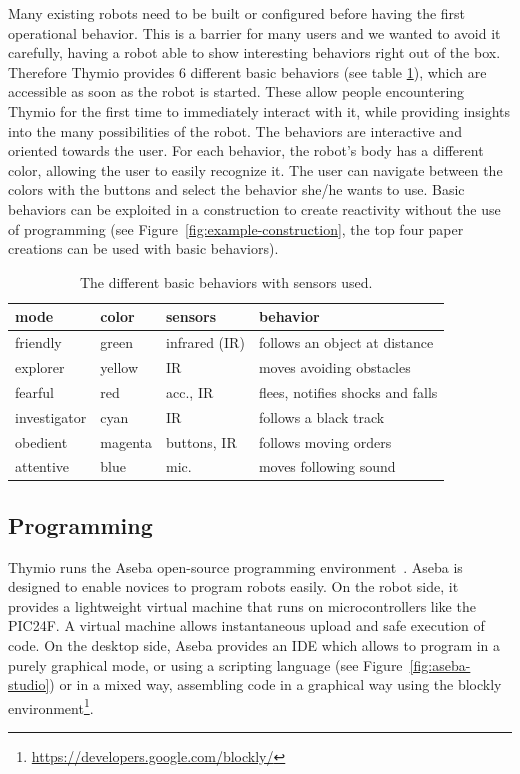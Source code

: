 \documentclass[letterpaper, 10 pt, conference]{ieeeconf}  %
\begin{document}
Many existing robots need to be built or configured before having the first operational behavior. 
This is a barrier for many users and we wanted to avoid it carefully, having a robot able to show interesting behaviors right out of the box.
Therefore Thymio provides 6 different basic behaviors (see table \ref{tbl:basic-behaviors}), which are accessible as soon as the robot is started.
These allow people encountering Thymio for the first time to immediately interact with it, while providing insights into the many possibilities of the robot.
The behaviors are interactive and oriented towards the user. %
For each behavior, the robot's body has a different color, allowing the user to easily recognize it.
The user can navigate between the colors with the buttons and select the behavior she/he wants to use.
Basic behaviors can be exploited in a construction to create reactivity without the use of programming (see Figure~\ref{fig:example-construction}, the top four paper creations can be used with basic behaviors).

\begin{table}
\begin{tabularx}{\columnwidth}{@{}llll@{}}
\toprule
mode & color & sensors & behavior \\
\midrule
friendly & green & infrared (IR) & follows an object at distance \\
explorer & yellow & IR & moves avoiding obstacles \\
fearful & red & acc., IR & flees, notifies shocks and falls \\
investigator & cyan & IR & follows a black track \\
obedient & magenta & buttons, IR & follows moving orders \\
attentive & blue & mic. & moves following sound \\
\bottomrule
\end{tabularx}
\caption{The different basic behaviors with sensors used.}
\label{tbl:basic-behaviors}
\end{table}


\subsection{Programming}
\label{sec:aseba}

Thymio runs the Aseba open-source programming environment~\cite{aseba}.
Aseba is designed to enable novices to program robots easily.
On the robot side, it provides a lightweight virtual machine that runs on microcontrollers like the PIC24F.
A virtual machine allows instantaneous upload and safe execution of code.
On the desktop side, Aseba provides an IDE which allows to program in a purely graphical mode, or using a scripting language (see Figure~\ref{fig:aseba-studio}) or in a mixed way, assembling code in a graphical way using the blockly environment\footnote{\url{https://developers.google.com/blockly/}}.
\end{document}
